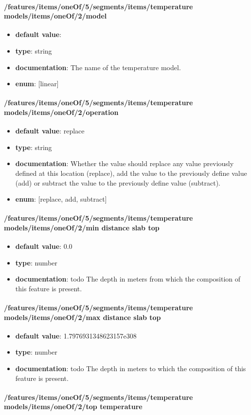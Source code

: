 \paragraph{/features/items/oneOf/5/segments/items/temperature models/items/oneOf/2/model}
\begin{itemize}\item {\bf default value}: 
\item {\bf type}: string
\item {\bf documentation}: The name of the temperature model.
\item {\bf enum}: [linear]\end{itemize}\paragraph{/features/items/oneOf/5/segments/items/temperature models/items/oneOf/2/operation}
\begin{itemize}\item {\bf default value}: replace
\item {\bf type}: string
\item {\bf documentation}: Whether the value should replace any value previously defined at this location (replace), add the value to the previously define value (add) or subtract the value to the previously define value (subtract).
\item {\bf enum}: [replace, add, subtract]\end{itemize}\paragraph{/features/items/oneOf/5/segments/items/temperature models/items/oneOf/2/min distance slab top}
\begin{itemize}\item {\bf default value}: 0.0
\item {\bf type}: number
\item {\bf documentation}: todo The depth in meters from which the composition of this feature is present.
\end{itemize}\paragraph{/features/items/oneOf/5/segments/items/temperature models/items/oneOf/2/max distance slab top}
\begin{itemize}\item {\bf default value}: 1.7976931348623157e308
\item {\bf type}: number
\item {\bf documentation}: todo The depth in meters to which the composition of this feature is present.
\end{itemize}\paragraph{/features/items/oneOf/5/segments/items/temperature models/items/oneOf/2/top temperature}
